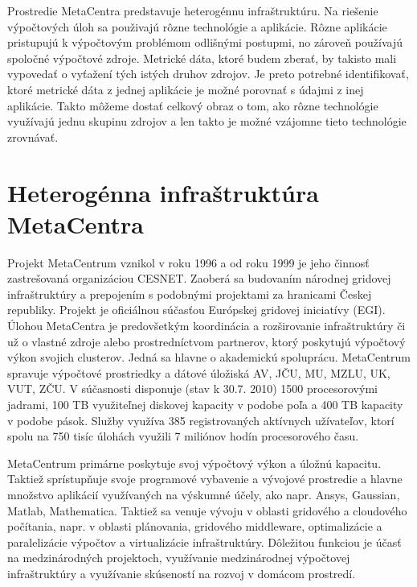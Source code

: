 \documentclass[12pt,twoside,color,cover,table]{fithesis3}
\begin{document}
Prostredie MetaCentra predstavuje heterogénnu infraštruktúru. Na riešenie výpočtových úloh sa použivajú rôzne technológie a aplikácie. Rôzne aplikácie pristupujú k výpočtovým problémom odlišnými postupmi,
no zároveň používajú spoločné výpočtové zdroje. Metrické dáta, ktoré budem zberať, by takisto mali vypovedať o vyťažení tých istých druhov 
zdrojov. Je preto potrebné identifikovať, ktoré metrické dáta z jednej aplikácie je možné porovnať s údajmi z inej aplikácie. Takto môžeme dostať celkový obraz o tom, ako rôzne technológie využívajú
jednu skupinu zdrojov a len takto je možné vzájomne tieto technológie zrovnávať. 


\chapter{Heterogénna infraštruktúra MetaCentra}
Projekt MetaCentrum vznikol v roku 1996 a od roku 1999 je jeho činnosť zastrešovaná organizáciou CESNET. Zaoberá sa budovaním národnej gridovej infraštruktúry a prepojením s podobnými projektami za hranicami
Českej republiky. Projekt je oficiálnou súčasťou Európskej gridovej iniciatívy (EGI). Úlohou MetaCentra je predovšetkým koordinácia a rozširovanie infraštruktúry či už o vlastné zdroje alebo prostredníctvom
partnerov, ktorý poskytujú výpočtový výkon svojich clusterov. Jedná sa hlavne o akademickú spoluprácu. MetaCentrum spravuje výpočtové prostriedky a dátové úložiská AV, JČU, MU, MZLU, UK, VUT, ZČU.
V súčasnosti disponuje (stav k 30.7. 2010) 1500 procesorovými jadrami, 100 TB využiteľnej diskovej kapacity v podobe poľa a 400 TB kapacity v podobe pások. Služby využíva 385 registrovaných aktívnych užívateľov, ktorí 
spolu na 750 tisíc úlohách využili 7 miliónov hodín procesorového času.

MetaCentrum primárne poskytuje svoj výpočtový výkon a úložnú kapacitu. Taktiež sprístupňuje svoje programové vybavenie a vývojové prostredie a hlavne množstvo aplikácií využívaných na výskumné účely, ako napr. 
Ansys, Gaussian, Matlab, Mathematica. Taktiež sa venuje vývoju v oblasti gridového a cloudového počítania, napr. v oblasti plánovania, gridového middleware, optimalizácie a paralelizácie výpočtov a virtualizácie
infraštruktúry. Dôležitou funkciou je účasť na medzinárodných projektoch, využívanie medzinárodnej výpočtovej infraštruktúry a využívanie skúseností na rozvoj v domácom prostredí.%
\end{document}
